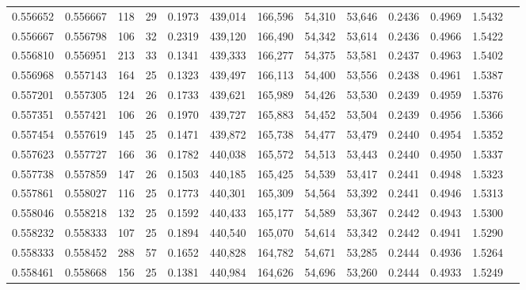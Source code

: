 \begin{tabular}{rrrrrrrrrrrrr}
0.556652 & 0.556667 &    118 &    29 &                                     0.1973 & 439,014 & 166,596 &  54,310 &  53,646 & 0.2436 & 0.4969 & 1.5432 \\
0.556667 & 0.556798 &    106 &    32 &                                     0.2319 & 439,120 & 166,490 &  54,342 &  53,614 & 0.2436 & 0.4966 & 1.5422 \\
0.556810 & 0.556951 &    213 &    33 &                                     0.1341 & 439,333 & 166,277 &  54,375 &  53,581 & 0.2437 & 0.4963 & 1.5402 \\
0.556968 & 0.557143 &    164 &    25 &                                     0.1323 & 439,497 & 166,113 &  54,400 &  53,556 & 0.2438 & 0.4961 & 1.5387 \\
0.557201 & 0.557305 &    124 &    26 &                                     0.1733 & 439,621 & 165,989 &  54,426 &  53,530 & 0.2439 & 0.4959 & 1.5376 \\
0.557351 & 0.557421 &    106 &    26 &                                     0.1970 & 439,727 & 165,883 &  54,452 &  53,504 & 0.2439 & 0.4956 & 1.5366 \\
0.557454 & 0.557619 &    145 &    25 &                                     0.1471 & 439,872 & 165,738 &  54,477 &  53,479 & 0.2440 & 0.4954 & 1.5352 \\
0.557623 & 0.557727 &    166 &    36 &                                     0.1782 & 440,038 & 165,572 &  54,513 &  53,443 & 0.2440 & 0.4950 & 1.5337 \\
0.557738 & 0.557859 &    147 &    26 &                                     0.1503 & 440,185 & 165,425 &  54,539 &  53,417 & 0.2441 & 0.4948 & 1.5323 \\
0.557861 & 0.558027 &    116 &    25 &                                     0.1773 & 440,301 & 165,309 &  54,564 &  53,392 & 0.2441 & 0.4946 & 1.5313 \\
0.558046 & 0.558218 &    132 &    25 &                                     0.1592 & 440,433 & 165,177 &  54,589 &  53,367 & 0.2442 & 0.4943 & 1.5300 \\
0.558232 & 0.558333 &    107 &    25 &                                     0.1894 & 440,540 & 165,070 &  54,614 &  53,342 & 0.2442 & 0.4941 & 1.5290 \\
0.558333 & 0.558452 &    288 &    57 &                                     0.1652 & 440,828 & 164,782 &  54,671 &  53,285 & 0.2444 & 0.4936 & 1.5264 \\
0.558461 & 0.558668 &    156 &    25 &                                     0.1381 & 440,984 & 164,626 &  54,696 &  53,260 & 0.2444 & 0.4933 & 1.5249 \\

\end{tabular}
